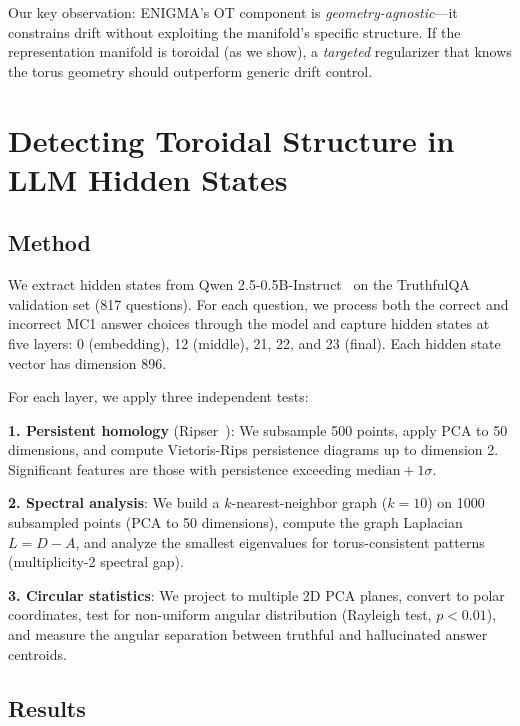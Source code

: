 \documentclass[11pt,a4paper]{article}
\begin{document}
Our key observation: ENIGMA's OT component is \emph{geometry-agnostic}---it constrains drift without exploiting the manifold's specific structure. If the representation manifold is toroidal (as we show), a \emph{targeted} regularizer that knows the torus geometry should outperform generic drift control.

\section{Detecting Toroidal Structure in LLM Hidden States}

\subsection{Method}

We extract hidden states from Qwen 2.5-0.5B-Instruct~\cite{qwen2025} on the TruthfulQA validation set (817 questions). For each question, we process both the correct and incorrect MC1 answer choices through the model and capture hidden states at five layers: 0 (embedding), 12 (middle), 21, 22, and 23 (final). Each hidden state vector has dimension 896.

For each layer, we apply three independent tests:

\textbf{1. Persistent homology} (Ripser~\cite{bauer2021ripser}): We subsample 500 points, apply PCA to 50 dimensions, and compute Vietoris-Rips persistence diagrams up to dimension 2. Significant features are those with persistence exceeding $\text{median} + 1\sigma$.

\textbf{2. Spectral analysis}: We build a $k$-nearest-neighbor graph ($k=10$) on 1000 subsampled points (PCA to 50 dimensions), compute the graph Laplacian $L = D - A$, and analyze the smallest eigenvalues for torus-consistent patterns (multiplicity-2 spectral gap).

\textbf{3. Circular statistics}: We project to multiple 2D PCA planes, convert to polar coordinates, test for non-uniform angular distribution (Rayleigh test, $p < 0.01$), and measure the angular separation between truthful and hallucinated answer centroids.

\subsection{Results}
\end{document}
